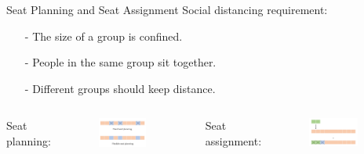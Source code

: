     \begin{frame}{Seat Planning and Seat Assignment}
      Social distancing requirement: 
      
      \begin{itemize}
        \item[-] The size of a group is confined.
        \item[-] People in the same group sit together.
        \item[-] Different groups should keep distance.
      \end{itemize}
      
      \vspace{0.8cm}

      \begin{columns}
        \column{5cm}  %
        Seat planning: 
          \begin{figure}[ht]
            \centering
            \includegraphics[width = 0.8\textwidth]{./images/seat_planning.png}
          \end{figure}
          \column{5cm}
        Seat assignment: 
          \scriptsize
          \begin{figure}[ht]
            \centering
            \includegraphics[width = 0.8\textwidth]{./images/seat_assignment.png}
          \end{figure}
      \end{columns}
    
    \end{frame}
    

